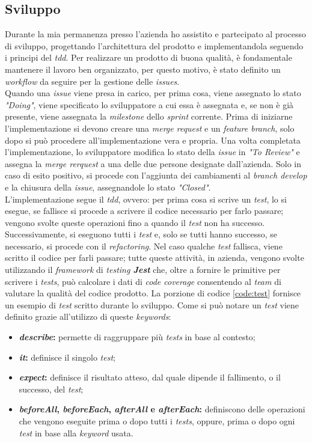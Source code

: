 \subsection{Sviluppo}
Durante la mia permanenza presso l'azienda ho assistito e partecipato al processo di sviluppo, progettando l'architettura del prodotto e implementandola seguendo i principi del \emph{\acrfull{tdd}}. 
Per realizzare un prodotto di buona qualità, è fondamentale mantenere il lavoro ben organizzato, per questo motivo, è stato definito un \emph{workflow} da seguire per la gestione delle \emph{issues}. \\

Quando una \emph{issue} viene presa in carico, per prima cosa, viene assegnato lo stato \emph{"Doing"}, viene specificato lo sviluppatore a cui essa è assegnata e, se non è già presente, viene assegnata la \emph{milestone} dello \emph{sprint} corrente. 
Prima di iniziarne l'implementazione si devono creare una \emph{merge request} e un \emph{feature branch}, solo dopo si può procedere all'implementazione vera e propria. 
Una volta completata l'implementazione, lo sviluppatore modifica lo stato della \emph{issue} in \emph{"To Review"} e assegna la \emph{merge rerquest} a una delle due persone designate dall'azienda.
Solo in caso di esito positivo, si procede con l'aggiunta dei cambiamenti al \emph{branch develop} e la chiusura della \emph{issue}, assegnandole lo stato \emph{"Closed"}. \\

L'implementazione segue il \emph{\acrlong{tdd}}, ovvero: per prima cosa si scrive un \emph{test}, lo si esegue, se fallisce si procede a scrivere il codice necessario per farlo passare; vengono svolte queste operazioni fino a quando il \emph{test} non ha successo.
Successivamente, si eseguono tutti i \emph{test} e, solo se tutti hanno successo, se necessario, si procede con il \emph{refactoring}. 
Nel caso qualche \emph{test} fallisca, viene scritto il codice per farli passare; tutte queste attività, in azienda, vengono svolte utilizzando il \emph{framework} di \emph{testing \textbf{Jest}} che, oltre a fornire le primitive per scrivere i \emph{tests}, può calcolare i dati di \emph{code coverage} consentendo al \emph{team} di valutare la qualità del codice prodotto.
La porzione di codice \ref{code:test} fornisce un esempio di \emph{test} scritto durante lo sviluppo. 
Come si può notare un \emph{test} viene definito grazie all'utilizzo di queste \emph{keywords}:
\begin{itemize}
  \item \textbf{\emph{describe}:} permette di raggruppare più \emph{tests} in base al contesto;
  \item \textbf{\emph{it}:} definisce il singolo \emph{test};
  \item \textbf{\emph{expect}:} definisce il risultato atteso, dal quale dipende il fallimento, o il successo, del \emph{test};
  \item \textbf{\emph{beforeAll}, \emph{beforeEach}, \emph{afterAll} e \emph{afterEach}:} definiscono delle operazioni che vengono eseguite prima o dopo tutti i \emph{tests}, oppure, prima o dopo ogni \emph{test} in base alla \emph{keyword} usata.
\end{itemize}

